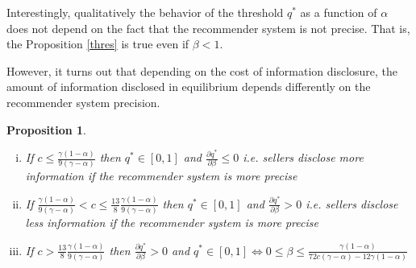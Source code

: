 \documentclass[a4paper]{article}
\newtheorem{proposition}[theorem]{Proposition}
\begin{document}
Interestingly, qualitatively the behavior of the threshold $q^*$ as a function of $\alpha$ does not depend on the fact that the recommender system is not precise. That is, the Proposition \ref{thres} is true even if $\beta < 1$.



However, it turns out that depending on the cost of information disclosure, the amount of information disclosed in equilibrium depends differently on the recommender system precision.




\begin{proposition}\label{thres_beta}
	\begin{enumerate}[(i)]
		\item If $c \le \frac{\gamma(1-\alpha)}{9(\gamma - \alpha)}$ then $q^* \in [0, 1]$ and $\frac{\partial q^*}{\partial \beta} \le 0$ i.e. sellers disclose more information if the recommender system is more precise
		\item If $\frac{\gamma(1-\alpha)}{9(\gamma - \alpha)} < c \le \frac{13}{8}\frac{\gamma(1-\alpha)}{9(\gamma - \alpha)}$ then $q^* \in [0, 1]$ and $\frac{\partial q^*}{\partial \beta} > 0$ i.e. sellers disclose less information if the recommender system is more precise
		\item If $c > \frac{13}{8}\frac{\gamma(1-\alpha)}{9(\gamma - \alpha)}$ then $\frac{\partial q^*}{\partial \beta} > 0$ and $q^* \in [0, 1] \iff 0 \le \beta \le \frac{\gamma(1-\alpha)}{72 c (\gamma - \alpha) - 12 \gamma (1-\alpha)}$ 
	\end{enumerate}
\end{proposition}
\end{document}
